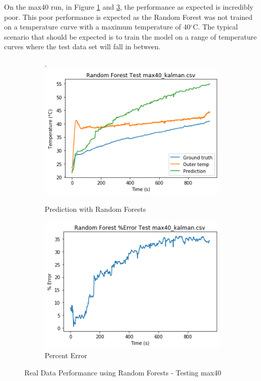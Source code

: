 On the max40 run, in Figure \ref{rf40} and \ref{rf40err}, the performance as expected is incredibly poor. This poor performance is expected as the Random Forest was not trained on a temperature curve with a maximum temperature of 40$^\circ$C. The typical scenario that should be expected is to train the model on a range of temperature curves where the test data set will fall in between.

\begin{figure}[ht]
    \begin{subfigure}{.5\linewidth}.
        \centering
    	\includegraphics[width=\linewidth]{other/RF_prediction_real3.png}
        \caption{Prediction with Random Forests}
        \label{rf40}
    \end{subfigure}
    \begin{subfigure}{.5\linewidth}
    	\centering
    	\includegraphics[width=\linewidth]{other/RF_error_real3.png}
        \caption{Percent Error}
        \label{rf40err}
    \end{subfigure}
    \caption{Real Data Performance using Random Forests - Testing max40}
\end{figure}